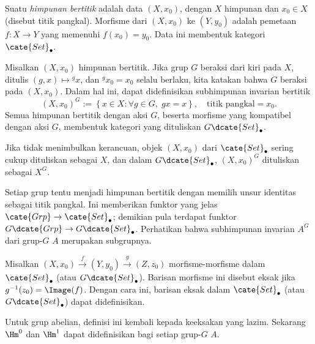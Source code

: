 \begin{definisi}\label{def:pointed-set}
	Suatu \emph{himpunan bertitik} adalah data $(X,x_0)$, dengan $X$ himpunan
	dan $x_0\in X$ (disebut titik pangkal). Morfisme dari $(X,x_0)$ ke
	$(Y,y_0)$ adalah pemetaan $f:X\to Y$ yang memenuhi $f(x_0)=y_0$. Data ini
	membentuk kategori $\cate{Set}_\bullet$.
	
	Misalkan $(X,x_0)$ himpunan bertitik. Jika grup $G$ beraksi dari kiri pada
	$X$, ditulis $(g,x)\mapsto{}^gx$, dan ${}^gx_0=x_0$ selalu berlaku, kita
	katakan bahwa $G$ beraksi pada $(X,x_0)$. Dalam hal ini, dapat didefinisikan
	subhimpunan invarian bertitik
	\[ (X, x_0)^G := \left\{ x \in X: \forall g \in G, \; gx = x \right\}, \quad \text{titik pangkal} = x_0. \]
	Semua himpunan bertitik dengan aksi $G$, beserta morfisme yang kompatibel
	dengan aksi $G$, membentuk kategori yang dituliskan
	$G\dcate{Set}_\bullet$.
\end{definisi}

Jika tidak menimbulkan kerancuan, objek $(X,x_0)$ dari
$\cate{Set}_\bullet$ sering cukup dituliskan sebagai $X$, dan dalam
$G\dcate{Set}_\bullet$, $(X,x_0)^G$ dituliskan sebagai $X^G$.

Setiap grup tentu menjadi himpunan bertitik dengan memilih unsur identitas
sebagai titik pangkal. Ini memberikan funktor yang jelas
$\cate{Grp}\to\cate{Set}_\bullet$; demikian pula terdapat funktor
$G\dcate{Grp}\to G\dcate{Set}_\bullet$. Perhatikan bahwa subhimpunan
invarian $A^G$ dari grup-$G$ $A$ merupakan subgrupnya.

\begin{definisi}\label{def:pointed-exact}
	Misalkan
	$(X,x_0)\xrightarrow{f}(Y,y_0)\xrightarrow{g}(Z,z_0)$ morfisme-morfisme
	dalam $\cate{Set}_\bullet$ (atau $G\dcate{Set}_\bullet$). Barisan morfisme
	ini disebut eksak jika $g^{-1}(z_0)=\Image(f)$. Dengan cara ini,
	barisan eksak dalam $\cate{Set}_\bullet$ (atau
	$G\dcate{Set}_\bullet$) dapat didefinisikan.
\end{definisi}

Untuk grup abelian, definisi ini kembali kepada keeksakan yang lazim.
Sekarang $\Hm^0$ dan $\Hm^1$ dapat didefinisikan bagi setiap grup-$G$ $A$.

